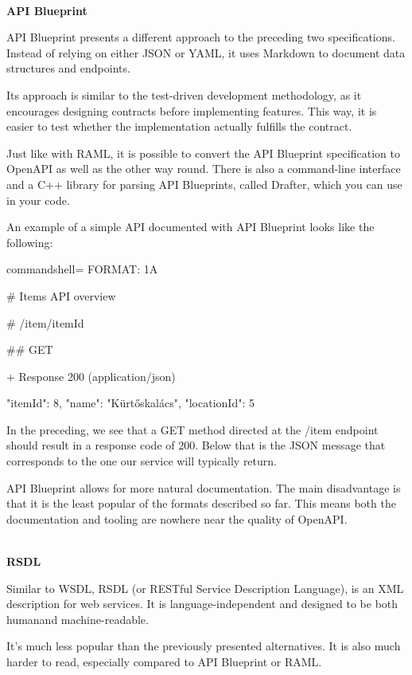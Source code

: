 \hspace*{\fill} \\ %
\noindent
\textbf{API Blueprint}

API Blueprint presents a different approach to the preceding two specifications. Instead of relying on either JSON or YAML, it uses Markdown to document data structures and endpoints.

Its approach is similar to the test-driven development methodology, as it encourages designing contracts before implementing features. This way, it is easier to test whether the implementation actually fulfills the contract.

Just like with RAML, it is possible to convert the API Blueprint specification to OpenAPI as well as the other way round. There is also a command-line interface and a C++ library for parsing API Blueprints, called Drafter, which you can use in your code.

An example of a simple API documented with API Blueprint looks like the following:

\begin{tcblisting}{commandshell={}}
FORMAT: 1A

# Items API overview

# /item/{itemId}

## GET

+ Response 200 (application/json)

    {
      "itemId": 8,
      "name": "Kürtőskalács",
      "locationId": 5
    }
\end{tcblisting}

In the preceding, we see that a GET method directed at the /item endpoint should result in a response code of 200. Below that is the JSON message that corresponds to the one our service will typically return.

API Blueprint allows for more natural documentation. The main disadvantage is that it is the least popular of the formats described so far. This means both the documentation and tooling are nowhere near the quality of OpenAPI.

\hspace*{\fill} \\ %
\noindent
\textbf{RSDL}

Similar to WSDL, RSDL (or RESTful Service Description Language), is an XML description for web services. It is language-independent and designed to be both humanand machine-readable.

It's much less popular than the previously presented alternatives. It is also much harder to read, especially compared to API Blueprint or RAML.

